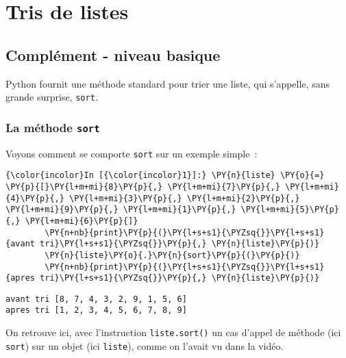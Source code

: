     
    
    
    

    

    \hypertarget{tris-de-listes}{%
\section{Tris de listes}\label{tris-de-listes}}

    \hypertarget{compluxe9ment---niveau-basique}{%
\subsection{Complément - niveau
basique}\label{compluxe9ment---niveau-basique}}

    Python fournit une méthode standard pour trier une liste, qui s'appelle,
sans grande surprise, \texttt{sort}.

    \hypertarget{la-muxe9thode-sort}{%
\subsubsection{\texorpdfstring{La méthode
\texttt{sort}}{La méthode sort}}\label{la-muxe9thode-sort}}

    Voyons comment se comporte \texttt{sort} sur un exemple simple~:

    \begin{Verbatim}[commandchars=\\\{\}]
{\color{incolor}In [{\color{incolor}1}]:} \PY{n}{liste} \PY{o}{=} \PY{p}{[}\PY{l+m+mi}{8}\PY{p}{,} \PY{l+m+mi}{7}\PY{p}{,} \PY{l+m+mi}{4}\PY{p}{,} \PY{l+m+mi}{3}\PY{p}{,} \PY{l+m+mi}{2}\PY{p}{,} \PY{l+m+mi}{9}\PY{p}{,} \PY{l+m+mi}{1}\PY{p}{,} \PY{l+m+mi}{5}\PY{p}{,} \PY{l+m+mi}{6}\PY{p}{]}
        \PY{n+nb}{print}\PY{p}{(}\PY{l+s+s1}{\PYZsq{}}\PY{l+s+s1}{avant tri}\PY{l+s+s1}{\PYZsq{}}\PY{p}{,} \PY{n}{liste}\PY{p}{)}
        \PY{n}{liste}\PY{o}{.}\PY{n}{sort}\PY{p}{(}\PY{p}{)}
        \PY{n+nb}{print}\PY{p}{(}\PY{l+s+s1}{\PYZsq{}}\PY{l+s+s1}{apres tri}\PY{l+s+s1}{\PYZsq{}}\PY{p}{,} \PY{n}{liste}\PY{p}{)}
\end{Verbatim}


    \begin{Verbatim}[commandchars=\\\{\}]
avant tri [8, 7, 4, 3, 2, 9, 1, 5, 6]
apres tri [1, 2, 3, 4, 5, 6, 7, 8, 9]

    \end{Verbatim}

    On retrouve ici, avec l'instruction \texttt{liste.sort()} un cas d'appel
de méthode (ici \texttt{sort}) sur un objet (ici \texttt{liste}), comme
on l'avait vu dans la vidéo.

